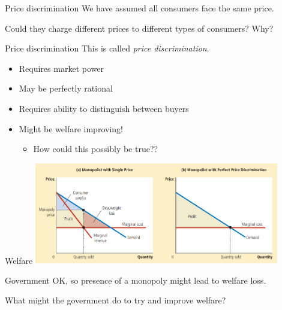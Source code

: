 \documentclass[aspectratio=169]{beamer}
\begin{document}
\begin{frame}{Price discrimination}
    We have assumed all consumers face the same price.

    \vspace{2mm}

    Could they charge different prices to different types of consumers? Why?
\end{frame}

\begin{frame}{Price discrimination}
    This is called \textit{price discrimination}.

    \begin{itemize}
        \item Requires market power
        \item May be perfectly rational
        \item Requires ability to distinguish between buyers
        \item Might be welfare improving!
        \begin{itemize}
            \item How could this possibly be true??
        \end{itemize}
    \end{itemize}
\end{frame}

\begin{frame}{Welfare}
    \centering
    \includegraphics[width = 0.8\textwidth,keepaspectratio]{../figs/pricediscrim.png}
\end{frame}

\begin{frame}{Government}
    OK, so presence of a monopoly might lead to welfare loss.

    \vspace{2mm}

    What might the government do to try and improve welfare?
\end{frame}
\end{document}
